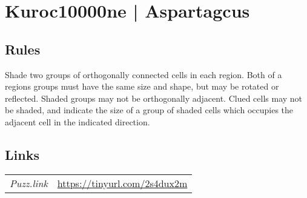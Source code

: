 \section[Kuroc10000ne | Aspartagcus {[\emph{Kuroclone}]}]{Kuroc10000ne | {\normalfont Aspartagcus}}
\label{sec:54-kuroc10000ne-aspartagcus}

\subsection*{Rules}
\begin{markdown}
Shade two groups of orthogonally connected cells in each region. Both of a regions groups must have the same size and shape, but may be rotated or reflected. Shaded groups may not be orthogonally adjacent. Clued cells may not be shaded, and indicate the size of a group of shaded cells which occupies the adjacent cell in the indicated direction.
\end{markdown}
\subsection*{Links}
\begin{tabularx}{\textwidth}{l X}
\emph{Puzz.link} & \url{https://tinyurl.com/2s4dux2m} \\
\end{tabularx}
\pagebreak
